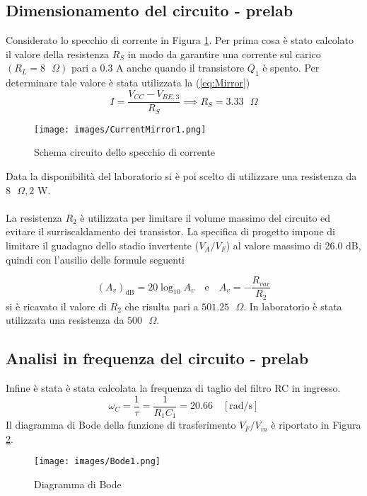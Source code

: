 \subsection{Dimensionamento del circuito - prelab}\label{ch:Prelab1}
Considerato lo specchio di corrente in Figura \ref{fig:CurrentMirror1}. Per prima cosa è stato calcolato il valore della resistenza $R_S$ in modo da garantire una corrente sul carico $(R_L=8\text{ }\Omega)$ pari a $0.3\text{ A}$ anche quando il transistore $Q_1$ è spento. Per determinare tale valore è stata utilizzata la (\ref{eq:Mirror})
\begin{equation}\label{eq:Mirror}
    I=\frac{V_{CC}-V_{BE,3}}{R_S}\implies R_S=3.33\text{ }\Omega
\end{equation}
\begin{figure}[H]
    \centering
    \texttt{[image: images/CurrentMirror1.png]}
    \caption{Schema circuito dello specchio di corrente}
    \label{fig:CurrentMirror1}
\end{figure}
\noindent Data la disponibilità del laboratorio si è poi scelto di utilizzare una resistenza da $8\text{ }\Omega,2\text{ W}$.\\\\
La resistenza $R_2$ è utilizzata per limitare il volume massimo del circuito ed evitare il surriscaldamento dei transistor. La specifica di progetto impone di limitare il guadagno dello stadio invertente ($V_A/V_F$) al valore massimo di 26.0 dB, quindi con l'ausilio delle formule seguenti

\begin{equation}
    (A_v)_{\text{dB}} = 20\log_{10}{A_v}\quad\text{e}\quad A_v = -\frac{R_{var}}{R_2}
\end{equation}
si è ricavato il valore di $R_2$ che risulta pari a $501.25\text{ }\Omega$. In laboratorio è stata utilizzata una resistenza da $500\text{ }\Omega$.

\subsection{Analisi in frequenza del circuito - prelab}
Infine è stata è stata calcolata la frequenza di taglio del filtro RC in ingresso.
\begin{equation}
    \omega_C=\frac{1}{\tau}=\frac{1}{R_1C_1}=20.66\quad[\text{rad/s}]
\end{equation}
Il diagramma di Bode della funzione di trasferimento $V_F/V_{in}$ è riportato in Figura \ref{fig:Bode1}.
\begin{figure}[H]
    \centering
    \texttt{[image: images/Bode1.png]}
    \caption{Diagramma di Bode}
    \label{fig:Bode1}
\end{figure}
